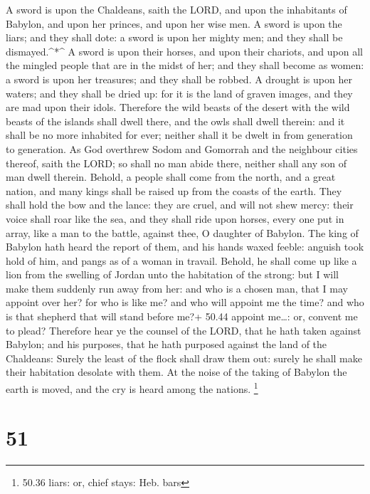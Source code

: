  A sword is upon the Chaldeans, saith the LORD, and upon
the inhabitants of Babylon, and upon her princes, and upon her wise men.
 A sword is upon the liars; and they shall dote: a sword is
upon her mighty men; and they shall be dismayed.\^{}*\^{} 
A sword is upon their horses, and upon their chariots, and upon all the
mingled people that are in the midst of her; and they shall become as
women: a sword is upon her treasures; and they shall be robbed.
 A drought is upon her waters; and they shall be dried up:
for it is the land of graven images, and they are mad upon their idols.
 Therefore the wild beasts of the desert with the wild
beasts of the islands shall dwell there, and the owls shall dwell
therein: and it shall be no more inhabited for ever; neither shall it be
dwelt in from generation to generation.  As God overthrew
Sodom and Gomorrah and the neighbour cities thereof, saith the LORD; so
shall no man abide there, neither shall any son of man dwell therein.
 Behold, a people shall come from the north, and a great
nation, and many kings shall be raised up from the coasts of the earth.
 They shall hold the bow and the lance: they are cruel, and
will not shew mercy: their voice shall roar like the sea, and they shall
ride upon horses, every one put in array, like a man to the battle,
against thee, O daughter of Babylon.  The king of Babylon
hath heard the report of them, and his hands waxed feeble: anguish took
hold of him, and pangs as of a woman in travail.  Behold,
he shall come up like a lion from the swelling of Jordan unto the
habitation of the strong: but I will make them suddenly run away from
her: and who is a chosen man, that I may appoint over her? for who is
like me? and who will appoint me the time? and who is that shepherd that
will stand before me?+ 50.44 appoint me\ldots: or, convent me to plead?
 Therefore hear ye the counsel of the LORD, that he hath
taken against Babylon; and his purposes, that he hath purposed against
the land of the Chaldeans: Surely the least of the flock shall draw them
out: surely he shall make their habitation desolate with them.
 At the noise of the taking of Babylon the earth is moved,
and the cry is heard among the nations. \footnote{50.36 liars: or, chief
  stays: Heb. bars}

\hypertarget{section-50}{%
\section{51}\label{section-50}}

